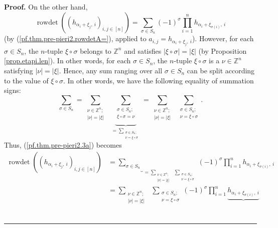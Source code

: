 \documentclass
[numbers=enddot,12pt,final,onecolumn,notitlepage,english]{scrartcl}%
\theoremstyle{definition}
\newenvironment{proof}[1][Proof]{\noindent\textbf{#1.} }{\ \rule{0.5em}{0.5em}}
\let\sumnonlimits\sum
\let\prodnonlimits\prod
\renewcommand{\sum}{\sumnonlimits\limits}
\renewcommand{\prod}{\prodnonlimits\limits}
\newenvironment{verlong}{}{}
\begin{document}
\begin{verlong}
\begin{proof}
On the other hand,%
\begin{equation}
\operatorname*{rowdet}\left(  \left(  h_{\alpha_{i}+\xi_{j},\ i}\right)
_{i,j\in\left[  n\right]  }\right)  =\sum_{\sigma\in S_{n}}\left(  -1\right)
^{\sigma}\prod_{i=1}^{n}h_{\alpha_{i}+\xi_{\sigma\left(  i\right)  },\ i}
\label{pf.thm.pre-pieri2.3a}%
\end{equation}
(by (\ref{pf.thm.pre-pieri2.rowdetA=}), applied to $a_{i,j}=h_{\alpha_{i}%
+\xi_{j},\ i}$). However, for each $\sigma\in S_{n}$, the $n$-tuple $\xi
\circ\sigma$ belongs to $\mathbb{Z}^{n}$ and satisfies $\left\vert \xi
\circ\sigma\right\vert =\left\vert \xi\right\vert $ (by Proposition
\ref{prop.etapi.len}). In other words, for each $\sigma\in S_{n}$, the
$n$-tuple $\xi\circ\sigma$ is a $\nu\in\mathbb{Z}^{n}$ satisfying $\left\vert
\nu\right\vert =\left\vert \xi\right\vert $. Hence, any sum ranging over all
$\sigma\in S_{n}$ can be split according to the value of $\xi\circ\sigma$. In
other words, we have the following equality of summation signs:%
\[
\sum_{\sigma\in S_{n}}=\sum_{\substack{\nu\in\mathbb{Z}^{n};\\\left\vert
\nu\right\vert =\left\vert \xi\right\vert }}\ \ \underbrace{\sum
_{\substack{\sigma\in S_{n};\\\xi\circ\sigma=\nu}}}_{=\sum_{\substack{\sigma
\in S_{n};\\\nu=\xi\circ\sigma}}}=\sum_{\substack{\nu\in\mathbb{Z}%
^{n};\\\left\vert \nu\right\vert =\left\vert \xi\right\vert }}\ \ \sum
_{\substack{\sigma\in S_{n};\\\nu=\xi\circ\sigma}}.
\]
Thus, (\ref{pf.thm.pre-pieri2.3a}) becomes%
\begin{align*}
\operatorname*{rowdet}\left(  \left(  h_{\alpha_{i}+\xi_{j},\ i}\right)
_{i,j\in\left[  n\right]  }\right)   &  =\underbrace{\sum_{\sigma\in S_{n}}%
}_{=\sum_{\substack{\nu\in\mathbb{Z}^{n};\\\left\vert \nu\right\vert
=\left\vert \xi\right\vert }}\ \ \sum_{\substack{\sigma\in S_{n};\\\nu
=\xi\circ\sigma}}}\left(  -1\right)  ^{\sigma}\prod_{i=1}^{n}h_{\alpha_{i}%
+\xi_{\sigma\left(  i\right)  },\ i}\\
&  =\sum_{\substack{\nu\in\mathbb{Z}^{n};\\\left\vert \nu\right\vert
=\left\vert \xi\right\vert }}\ \ \sum_{\substack{\sigma\in S_{n};\\\nu
=\xi\circ\sigma}}\left(  -1\right)  ^{\sigma}\prod_{i=1}^{n}%
\underbrace{h_{\alpha_{i}+\xi_{\sigma\left(  i\right)  },\ i}}%

\end{align*}
\end{proof}
\end{verlong}
\end{document}
